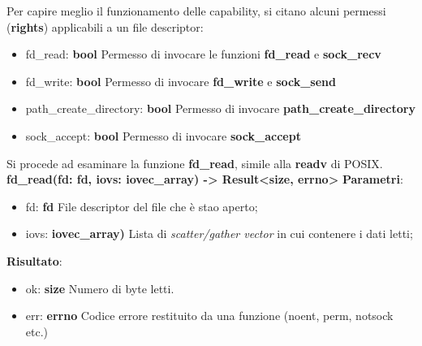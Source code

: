 Per capire meglio il funzionamento delle capability, si citano alcuni permessi (\textbf{rights}) applicabili a un file descriptor:
\begin{itemize}
        \item fd\_read: \textbf{bool} Permesso di invocare le funzioni \textbf{fd\_read} e \textbf{sock\_recv}
        \item fd\_write: \textbf{bool} Permesso di invocare \textbf{fd\_write} e \textbf{sock\_send}
        \item path\_create\_directory: \textbf{bool} Permesso di invocare \textbf{path\_create\_directory}
        \item sock\_accept: \textbf{bool} Permesso di invocare \textbf{sock\_accept} 
\end{itemize}
Si procede ad esaminare la funzione \textbf{fd\_read}, simile alla \textbf{readv} di POSIX.
\textbf{fd\_read(fd: fd, iovs: iovec\_array) -> Result<size, errno>}
\textbf{Parametri}:
\begin{itemize}
        \item fd: \textbf{fd} File descriptor del file che è stao aperto;
        \item iovs: \textbf{iovec\_array)} Lista di \emph{scatter/gather vector} in cui contenere i dati letti;
\end{itemize}
\textbf{Risultato}:
\begin{itemize}
        \item ok: \textbf{size} Numero di byte letti.
        \item err: \textbf{errno} Codice errore restituito da una funzione (noent, perm, notsock etc.)
\end{itemize}

